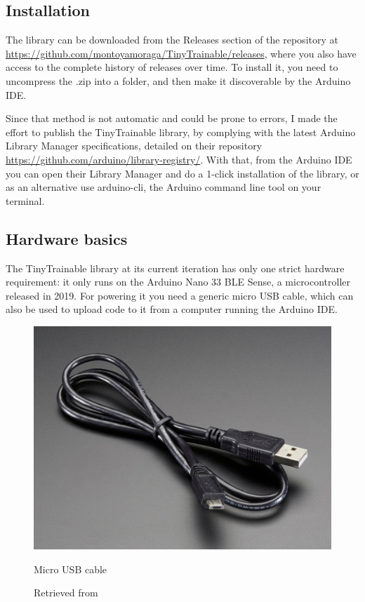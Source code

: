 \subsection{Installation}

The library can be downloaded from the Releases section of the repository at  \url{https://github.com/montoyamoraga/TinyTrainable/releases}, where you also have access to the complete history of releases over time. To install it, you need to uncompress the .zip into a folder, and then make it discoverable by the Arduino \acrfull{IDE}.

Since that method is not automatic and could be prone to errors, I made the effort to publish the TinyTrainable library, by complying with the latest Arduino Library Manager specifications, detailed on their repository \url{https://github.com/arduino/library-registry/}. With that, from the Arduino \acrshort{IDE} you can open their Library Manager and do a 1-click installation of the library, or as an alternative use arduino-cli, the Arduino command line tool on your terminal.

\subsection{Hardware basics}

The TinyTrainable library at its current iteration has only one strict hardware requirement: it only runs on the Arduino Nano 33 \acrshort{BLE} Sense, a microcontroller released in 2019. For powering it you need a generic micro USB cable, which can also be used to upload code to it from a computer running the Arduino IDE.

\begin{figure}[ht]
  \centering
  \includegraphics[width=0.75\linewidth,height=0.25\textheight,keepaspectratio]{images/materials-adafruit-micro-usb-cable.jpg}
  \caption{Micro USB cable}
  \caption*{Retrieved from \cite{website-materials-adafruit-micro-usb-cable}}
  \label{fig:materials-adafruit-usb-cable}
\end{figure}

